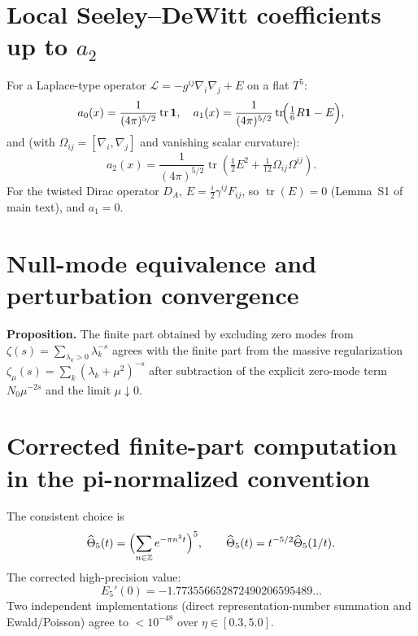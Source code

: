 \documentclass[11pt,a4paper]{article}
\begin{document}

\appendix
\section{Local Seeley--DeWitt coefficients up to $a_2$}
For a Laplace-type operator $\mathcal{L}=-g^{ij}\nabla_i\nabla_j+E$
on a flat $T^5$:
\[
  a_0(x)=\frac{1}{(4\pi)^{5/2}}\operatorname{tr}\mathbf{1}, \quad
  a_1(x)=\frac{1}{(4\pi)^{5/2}}\operatorname{tr}\!\Bigl(\tfrac16R\mathbf{1}-E\Bigr),
\]
and (with $\Omega_{ij}=[\nabla_i,\nabla_j]$ and vanishing scalar curvature):
\[
  a_2(x)=\frac{1}{(4\pi)^{5/2}}\operatorname{tr}\!\left(
    \tfrac12 E^2+\tfrac{1}{12}\Omega_{ij}\Omega^{ij}\right).
\]
For the twisted Dirac operator $D_A$, $E=\tfrac{i}{2}\gamma^{ij}F_{ij}$,
so $\operatorname{tr}(E)=0$ (Lemma~S1 of main text), and $a_1=0$.

\section{Null-mode equivalence and perturbation convergence}
\textbf{Proposition.}  The finite part obtained by excluding zero modes from
$\zeta(s)=\sum_{\lambda_k>0}\lambda_k^{-s}$ agrees with the finite part from the
massive regularization $\zeta_\mu(s)=\sum_k(\lambda_k+\mu^2)^{-s}$ after
subtraction of the explicit zero-mode term $N_0\mu^{-2s}$ and the limit $\mu\downarrow0$.

\section{Corrected finite-part computation in the pi-normalized convention}
\label{app:pi_finite_part}
The consistent choice is
\[
  \widehat\Theta_5(t)=\Bigl(\sum_{n\in\mathbb{Z}}e^{-\pi n^2 t}\Bigr)^5,
  \qquad \widehat\Theta_5(t)=t^{-5/2}\widehat\Theta_5(1/t).
\]
The corrected high-precision value:
\[
  E_5'(0) = -1.773556652872490206595489\ldots
\]
Two independent implementations (direct representation-number summation and
Ewald/Poisson) agree to $<10^{-48}$ over $\eta\in[0.3,5.0]$.
\end{document}
